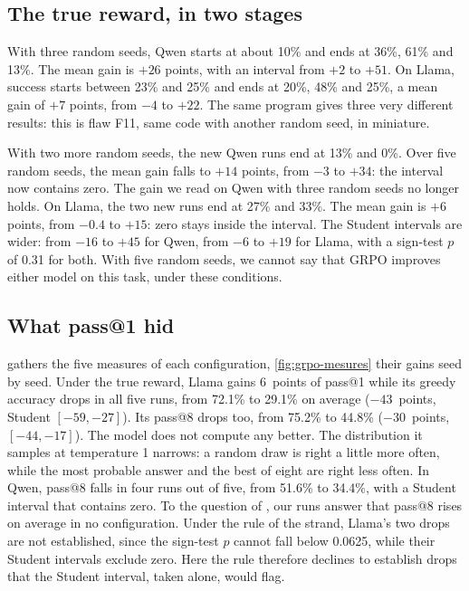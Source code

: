 \subsection{The true reward, in two stages}

With three random seeds, Qwen starts at about 10\% and ends at 36\%, 61\% and 13\%. The mean gain is
$+26$ points, with an interval from $+2$ to $+51$. On Llama, success starts between 23\% and 25\% and
ends at 20\%, 48\% and 25\%, a mean gain of $+7$ points, from $-4$ to $+22$. The same program gives
three very different results: this is flaw F11, same code with another random seed, in miniature.

With two more random seeds, the new Qwen runs end at 13\% and 0\%. Over five random seeds, the mean
gain falls to $+14$ points, from $-3$ to $+34$: the interval now contains zero. The gain we read
on Qwen with three random seeds no longer holds. On Llama, the two new runs end at 27\% and 33\%. The
mean gain is $+6$ points, from $-0.4$ to $+15$: zero stays inside the interval. The Student intervals
are wider: from $-16$ to $+45$ for Qwen, from $-6$ to $+19$ for Llama, with a sign-test
$p$ of 0.31 for both. With five random seeds, we cannot say that GRPO improves either model on this
task, under these conditions.

\subsection{What pass@1 hid}

 gathers the five measures of each configuration, \cref{fig:grpo-mesures} their
gains seed by seed. Under the true reward, Llama gains 6~points of pass@1 while its greedy accuracy drops
in all five runs, from 72.1\% to 29.1\% on average ($-43$~points, Student $[-59, -27]$). Its pass@8 drops
too, from 75.2\% to 44.8\% ($-30$~points, $[-44, -17]$). The model does not compute any better. The
distribution it samples at temperature 1 narrows: a random draw is right a little more often, while the
most probable answer and the best of eight are right less often. In Qwen, pass@8 falls in four runs out of
five, from 51.6\% to 34.4\%, with a Student interval that contains zero. To the question of
\textcite{yue2025rlvr}, our runs answer that pass@8 rises on average in no configuration. Under the rule
of the strand, Llama's two drops are not established, since the sign-test $p$ cannot fall below 0.0625,
while their Student intervals exclude zero. Here the rule therefore declines to establish drops that the
Student interval, taken alone, would flag.

